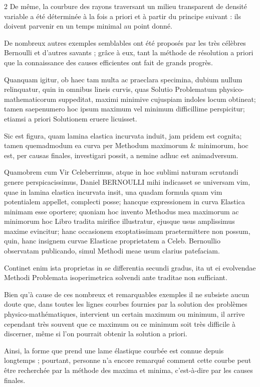 \documentclass[a4paper,10pt]{article}
\begin{document}
\begin{multicols}{2}
De même, la courbure des rayons traversant un milieu transparent de densité variable a été déterminée à la fois a priori et à partir du principe suivant : ils doivent parvenir en un temps minimal au point donné.

De nombreux autres exemples semblables ont été proposés par les très célèbres Bernoulli et d’autres savants ; grâce à eux, tant la méthode de résolution a priori que la connaissance des causes efficientes ont fait de grands progrès.


\columnbreak
Quanquam igitur, ob haec tam multa ac praeclara specimina, dubium nullum relinquatur, quin in omnibus lineis curvis, quas Solutio Problematum physico-mathematicorum suppeditat, maximi minimive cujuspiam indoles locum obtineat; tamen saepenumero hoc ipsum maximum vel minimum difficillime perspicitur; etiamsi a priori Solutionem eruere licuisset.

Sic est figura, quam lamina elastica incurvata induit, jam pridem est cognita; tamen quemadmodum ea curva per Methodum maximorum \& minimorum, hoc est, per causas finales, investigari possit, a nemine adhuc est animadversum.

Quamobrem cum Vir Celeberrimus, atque in hoc sublimi naturam scrutandi genere perspicacissimus, Daniel BERNOULLI mihi indicasset se universam vim, quae
in lamina elastica incurvata insit, una quadam formula quam vim potentialem appellet, complecti posse; hancque expressionem in curva Elastica minimam esse oportere; quoniam hoc invento Methodus mea maximorum ac minimorum hoc Libro tradita mirifice illustratur, ejusque usus amplissimus maxime evincitur; hanc occasionem exoptatissimam praetermittere non possum, quin, hanc insignem curvae Elasticae proprietatem a Celeb. Bernoullio observatam publicando, simul Methodi meae usum clarius patefaciam.

Continet enim ista proprietas in se differentia secundi gradus, ita ut ei evolvendae Methodi Problemata isoperimetrica solvendi ante traditae non sufficiant.

\columnbreak
Bien qu’à cause de ces nombreux et remarquables exemples il ne subsiste aucun doute que, dans toutes les lignes courbes fournies par la solution des problèmes physico-mathématiques, intervient un certain maximum ou minimum, il arrive cependant très souvent que ce maximum ou ce minimum soit très difficile à discerner, même si l’on pourrait obtenir la solution a priori.

Ainsi, la forme que prend une lame élastique courbée est connue depuis longtemps ; pourtant, personne n’a encore remarqué comment cette courbe peut être recherchée par la méthode des maxima et minima, c’est-à-dire par les causes finales.


\end{multicols}
\end{document}
